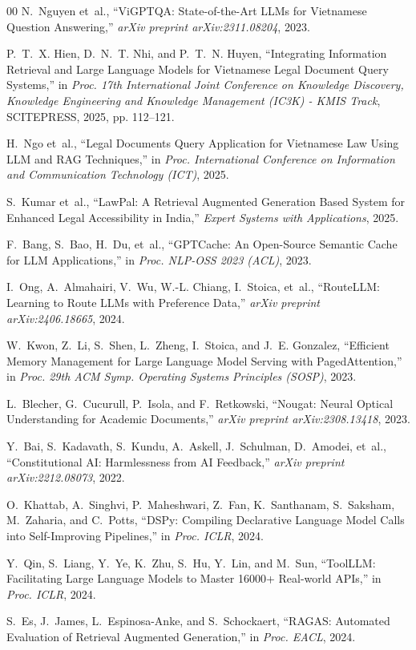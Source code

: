 \documentclass[11pt,a4paper]{article}
\begin{document}
\begin{thebibliography}{00}
N.~Nguyen et~al.,
``ViGPTQA: State-of-the-Art LLMs for Vietnamese Question Answering,''
\emph{arXiv preprint arXiv:2311.08204}, 2023.

P.~T.~X. Hien, D.~N.~T. Nhi, and P.~T.~N. Huyen,
``Integrating Information Retrieval and Large Language Models for Vietnamese Legal Document Query Systems,''
in \emph{Proc. 17th International Joint Conference on Knowledge Discovery, Knowledge Engineering and Knowledge Management (IC3K) - KMIS Track}, SCITEPRESS, 2025, pp. 112--121.

H.~Ngo et~al.,
``Legal Documents Query Application for Vietnamese Law Using LLM and RAG Techniques,''
in \emph{Proc. International Conference on Information and Communication Technology (ICT)}, 2025.

S.~Kumar et~al.,
``LawPal: A Retrieval Augmented Generation Based System for Enhanced Legal Accessibility in India,''
\emph{Expert Systems with Applications}, 2025.

F.~Bang, S.~Bao, H.~Du, et~al.,
``GPTCache: An Open-Source Semantic Cache for LLM Applications,''
in \emph{Proc. NLP-OSS 2023 (ACL)}, 2023.

I.~Ong, A.~Almahairi, V.~Wu, W.-L. Chiang, I.~Stoica, et~al.,
``RouteLLM: Learning to Route LLMs with Preference Data,''
\emph{arXiv preprint arXiv:2406.18665}, 2024.

W.~Kwon, Z.~Li, S.~Shen, L.~Zheng, I.~Stoica, and J.~E. Gonzalez,
``Efficient Memory Management for Large Language Model Serving with PagedAttention,''
in \emph{Proc. 29th ACM Symp. Operating Systems Principles (SOSP)}, 2023.

L.~Blecher, G.~Cucurull, P.~Isola, and F.~Retkowski,
``Nougat: Neural Optical Understanding for Academic Documents,''
\emph{arXiv preprint arXiv:2308.13418}, 2023.

Y.~Bai, S.~Kadavath, S.~Kundu, A.~Askell, J.~Schulman, D.~Amodei, et~al.,
``Constitutional AI: Harmlessness from AI Feedback,''
\emph{arXiv preprint arXiv:2212.08073}, 2022.

O.~Khattab, A.~Singhvi, P.~Maheshwari, Z.~Fan, K.~Santhanam, S.~Saksham, M.~Zaharia, and C.~Potts,
``DSPy: Compiling Declarative Language Model Calls into Self-Improving Pipelines,''
in \emph{Proc. ICLR}, 2024.

Y.~Qin, S.~Liang, Y.~Ye, K.~Zhu, S.~Hu, Y.~Lin, and M.~Sun,
``ToolLLM: Facilitating Large Language Models to Master 16000+ Real-world APIs,''
in \emph{Proc. ICLR}, 2024.

S.~Es, J.~James, L.~Espinosa-Anke, and S.~Schockaert,
``RAGAS: Automated Evaluation of Retrieval Augmented Generation,''
in \emph{Proc. EACL}, 2024.

\end{thebibliography}
\end{document}
